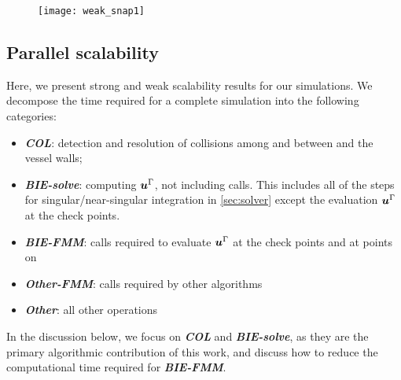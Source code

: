 

\begin{figure}[!bht]
\centering
  \texttt{[image: weak\_snap1]}
\end{figure}


\subsection{Parallel scalability}\label{ss:scalability}

  Here, we present strong and weak scalability results for our \rbc simulations. 
  We decompose the time required for a complete simulation into the following categories:%
 \begin{itemize}
    \item {\bf\em COL}: detection and resolution of collisions among
      \rbcs and between \rbcs and the vessel walls;
      \item {\bf\em BIE-solve}: computing ${\bm{u}}^{\Gamma}$, not including \fmm calls. This includes all of the steps for singular/near-singular integration in \cref{sec:solver} except the evaluation ${\bm{u}}^\Gamma$ at the check points.
      \item {\bf\em BIE-FMM}: \fmm calls required to evaluate ${\bm{u}}^{\Gamma}$ at the check points and at points on \rbcs
      \item {\bf\em Other-FMM}: \fmm calls required by other algorithms 
      \item {\bf\em Other}: all other operations
  \end{itemize}
In the discussion below, we focus on {\bf\em COL} and {\bf\em BIE-solve}, as
  they are the primary algorithmic contribution of this work, and discuss
  how to reduce the computational time required for {\bf\em BIE-FMM}.

